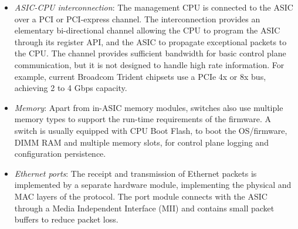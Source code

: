 \begin{itemize}
    The ASIC packet processing pipeline commonly consists of four stages.  The
    \emph{input arbiter} stage multiplexes and synchronizes packets from the
    Ethernet ports to the main processing pipeline of the silicon. The arbiter
    ensures non pre-emptive packet processing, by bridging the mismatch between
    the silicon processing clock rate and the link rate. The pipeline also
    contains a \emph{protocol parsing} stage and a \emph{memory lookup} stage.
    The protocol parser extracts significant packet fields from network
    packets, used by the memory lookup module to define packet processing and
    forwarding.  The lookup stage uses a memory module, integrated or external
    to the ASIC, which contains the forwarding policy.  Memory modules exhibit 
    trade-offs between cost and access speed and  memory cost and memory
    management complexity\footnote{A 32-bit TCAM lookup pcore running on a
        Virtex-5 FPGA~ with 550 MHz clock rate requires 1 clock
        cycle for a lookup, translating into a 2 ns delay. A DDR3-2400 SDRAM
        memory module operating at 1200 MHz and requiring 9 clock cycles per
        data access has a 9 ns lookup latency, while a PC133 SDRAM operating at
        133 MHz and requiring 3 clock cycles per data access has a 20 ns
    lookup latency.}. Finally, the \emph{output arbiter} module is responsible for
    applying modifications to the packet and forwarding it to the appropriate
    output queue. The processing pipeline may contain additional modules which
    extend functionality, providing access control list (ACL), virtual network
    queues, and flow statistics monitoring.

  \item \emph{ASIC-CPU interconnection}: The management CPU is connected to the ASIC
    over a PCI or PCI-express channel. The interconnection provides an
    elementary bi-directional channel allowing the CPU to program the ASIC
    through its register API, and the ASIC to propagate exceptional packets to
    the CPU\@. The channel provides sufficient bandwidth for basic control plane
    communication, but it is not designed to handle high rate information. For
    example, current Broadcom Trident chipsets use a PCIe 4x or 8x bus,
    achieving 2 to 4 Gbps capacity.  

  \item \emph{Memory}: Apart from in-ASIC memory modules, switches
    also use multiple memory types to support the run-time requirements of the
    firmware. A switch is usually equipped with CPU Boot Flash, to boot the
    OS/firmware, DIMM RAM and multiple memory slots, for control plane logging
    and configuration persistence.

  \item \emph{Ethernet ports}: The receipt and transmission of Ethernet packets
    is implemented by a separate hardware module, 
    implementing the physical and MAC layers of the protocol. The port module 
    connects with the  ASIC through a Media Independent Interface (MII) and
    contains small packet buffers to reduce packet loss.  
\end{itemize}

